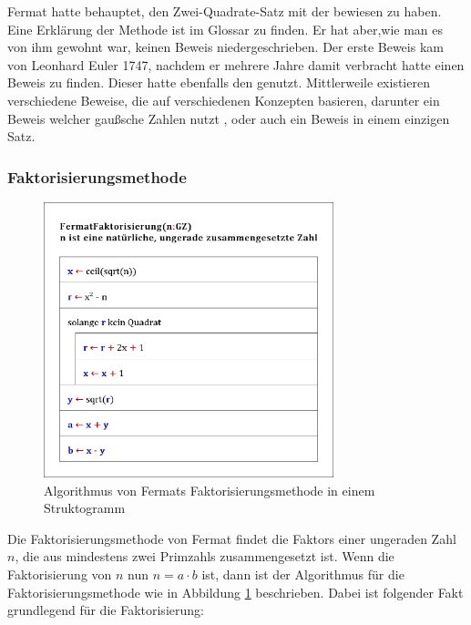 Fermat hatte behauptet, den Zwei-Quadrate-Satz mit der  bewiesen zu haben. Eine Erklärung der Methode ist im Glossar zu finden. Er hat aber,wie man es von ihm gewohnt war, keinen Beweis niedergeschrieben. Der erste Beweis kam von Leonhard Euler 1747, nachdem er mehrere Jahre damit verbracht hatte einen Beweis zu finden. Dieser hatte ebenfalls den  genutzt.
Mittlerweile existieren verschiedene Beweise, die auf verschiedenen Konzepten basieren, darunter ein Beweis welcher gaußsche Zahlen nutzt \cite{woodbury}, oder auch ein Beweis in einem einzigen Satz. \cite{zagier}

\subsubsection{Faktorisierungsmethode} \label{sec:faktorMethode}

\begin{figure}[htb]
    \centering
    \includegraphics[width=0.75\textwidth]{img/factor_algorithm.png}
    \caption{Algorithmus von Fermats Faktorisierungsmethode in einem Struktogramm}
    \label{fig:factorAlgorithm}
\end{figure}

Die Faktorisierungsmethode von Fermat findet die \Glspl{Faktor} einer  ungeraden Zahl $n$, die aus mindestens zwei \Glspl{Primzahl} zusammengesetzt ist. Wenn die Faktorisierung von $n$ nun $n = a \cdot b$ ist, dann ist der Algorithmus für die Faktorisierungsmethode wie in Abbildung \ref{fig:factorAlgorithm} beschrieben. Dabei ist folgender Fakt grundlegend für die Faktorisierung:

